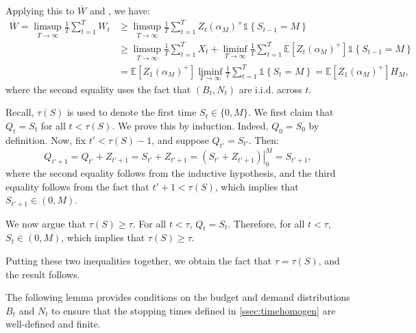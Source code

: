 \documentclass[mnsc,nonblindrev]{informs3}
\newcommand{\Exp}[1]{\mathbb{E} \left[ #1 \right]} %
\newcommand{\Ind}[1]{\mathds{1}\left\{ #1 \right\}}
\renewenvironment{proof}[1][Proof]{%
  \par\noindent{\itshape #1.} \ignorespaces
}{%
  \hfill\Halmos\par
}
\begin{document}
\begin{APPENDICES}
\begin{proof}
Applying this to $\overline{W}$ and , we have:
\begin{align*}
    \overline{W} = \limsup_{T \rightarrow \infty} \frac{1}{T} \sum_{t=1}^T W_t & \geq \limsup_{T \rightarrow \infty} \frac{1}{T} \sum_{t=1}^T Z_t(\alpha_M)^+ \Ind{S_{t-1} = M} \\
    & \geq \limsup_{T \rightarrow \infty} \frac{1}{T} \sum_{t=1}^T X_t + \liminf_{T \rightarrow \infty} \frac{1}{T} \sum_{t=1}^T \Exp{Z_t(\alpha_M)^+} \Ind{S_{t-1} = M} \\
    & {= \Exp{Z_1(\alpha_M)^+} \liminf_{T \rightarrow \infty} \frac{1}{T} \sum_{t=1}^T \Ind{S_{t} = M} = \Exp{Z_1(\alpha_M)^+} H_M,}
\end{align*}
where the second equality uses the fact that $(B_t, N_t)$ are i.i.d. across $t$.
\end{proof}



\RandomWalkEquivalence*
\begin{proof}
Recall, $\tau(S)$ is used to denote the first time $S_t \in \{0,M\}$.  We first claim that $Q_t = S_t$ for all $t < \tau(S)$. We prove this by induction. Indeed, $Q_0 = S_0$ by definition. Now, fix $t' < \tau(S)-1$, and suppose $Q_{t'} = S_{t'}$. Then:
\[
Q_{t'+1} = Q_{t'} + Z_{t'+1} =   S_{t'} + Z_{t'+1} = \left.(S_{t'} + Z_{t'+1})\right|_0^M = S_{t'+1},
\]
where the second equality follows from the inductive hypothesis, and the third equality follows from the fact that $t'+1 < \tau(S)$, which implies that $S_{t'+1} \in (0,M)$.

We now argue that $\tau(S) \geq \tau$. For all $t < \tau$, $Q_t = S_t$. Therefore, for all $t < \tau$, $S_t \in (0,M)$, which implies that $\tau(S) \geq \tau$. 

Putting these two inequalities together, we obtain the fact that $\tau = \tau(S)$, and the result follows.
\end{proof}


The following lemma provides conditions on the budget and demand distributions $B_t$ and $N_t$ to ensure that the stopping times defined in \cref{ssec:timehomogen} are well-defined and finite.


\end{APPENDICES}
\end{document}
